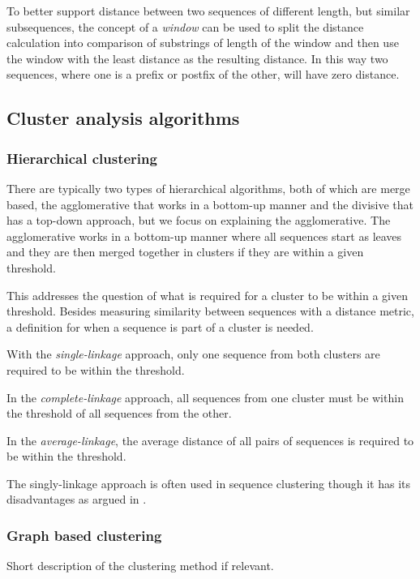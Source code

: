To better support distance between two sequences of different length, but
similar subsequences, the concept of a \emph{window} can be used to split the
distance calculation into comparison of substrings of length of the window
and then use the window with the least distance as the resulting distance. In
this way two sequences, where one is a prefix or postfix of the other, will
have zero distance.



\subsection{Cluster analysis algorithms}


\subsubsection{Hierarchical clustering}
There are typically two types of hierarchical algorithms, both of which are
merge based, the agglomerative that works in a bottom-up manner and the
divisive that has a top-down approach, but we focus on explaining the
agglomerative. The agglomerative works in a bottom-up manner where all
sequences start as leaves and they are then merged together in clusters if they
are within a given threshold.


This addresses the question of what is required for a cluster to be within a
given threshold. Besides measuring similarity between sequences with a distance
metric, a definition for when a sequence is part of a cluster is needed.

With the \textit{single-linkage} approach, only one sequence from both
clusters are required to be within the threshold.

In the \textit{complete-linkage} approach, all sequences from one cluster
must be within the threshold of all sequences from the other.

In the \textit{average-linkage}, the average distance of all pairs of
sequences is required to be within the threshold.

The singly-linkage approach is often used in sequence clustering though it has
its disadvantages as argued in \cite[pp. 62-63]{dong}.

\subsubsection{Graph based clustering}
Short description of the clustering method if relevant.


